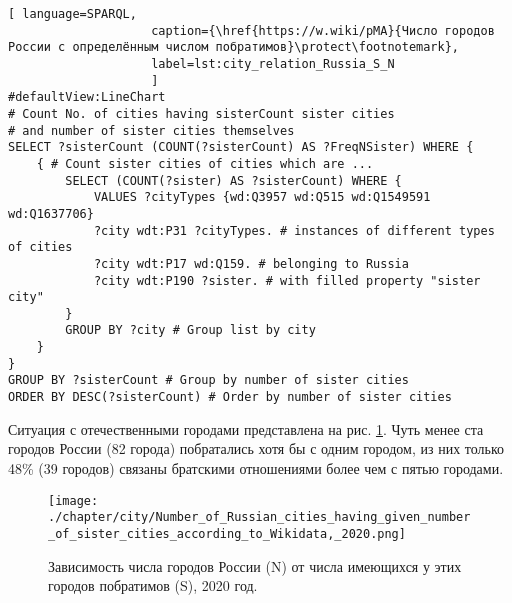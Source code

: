 \begin{lstlisting}[ language=SPARQL, 
                    caption={\href{https://w.wiki/pMA}{Число городов России с определённым числом побратимов}\protect\footnotemark},
                    label=lst:city_relation_Russia_S_N
                    ]
#defaultView:LineChart                                                   
# Count No. of cities having sisterCount sister cities  
# and number of sister cities themselves
SELECT ?sisterCount (COUNT(?sisterCount) AS ?FreqNSister) WHERE {                                                                                  
	{ # Count sister cities of cities which are ...
		SELECT (COUNT(?sister) AS ?sisterCount) WHERE {    
			VALUES ?cityTypes {wd:Q3957 wd:Q515 wd:Q1549591 wd:Q1637706}
			?city wdt:P31 ?cityTypes. # instances of different types of cities
			?city wdt:P17 wd:Q159. # belonging to Russia
			?city wdt:P190 ?sister. # with filled property "sister city"
		}
		GROUP BY ?city # Group list by city                             
	}
}
GROUP BY ?sisterCount # Group by number of sister cities
ORDER BY DESC(?sisterCount) # Order by number of sister cities                                  
\end{lstlisting}

Ситуация с отечественными городами представлена на рис. \ref{fig:city_relation_Russia_S_N}. Чуть менее ста городов России (82 города) побратались хотя бы с одним городом, из них только 48\% (39 городов) связаны братскими отношениями более чем с пятью городами.
%

\begin{figure}
    \texttt{[image: ./chapter/city/Number\_of\_Russian\_cities\_having\_given\_number\_of\_sister\_cities\_according\_to\_Wikidata,\_2020.png]}
  \caption[Зависимость числа городов России от числа побратимов, 2020 год.]{Зависимость числа городов России (N) от числа имеющихся у этих городов побратимов (S), 2020 год.}
  \label{fig:city_relation_Russia_S_N}
\end{figure}





